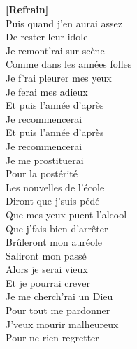 \documentclass{novel}
\begin{document}
\begin{multicols}{2}
\textbf{[Refrain]}\\

Puis quand j'en aurai assez\\
De rester leur idole\\
Je remont'rai sur scène\\
Comme dans les années folles\\
Je f'rai pleurer mes yeux\\
Je ferai mes adieux\\

Et puis l'année d'après\\
Je recommencerai\\
Et puis l'année d'après\\
Je recommencerai\\
Je me prostituerai\\
Pour la postérité\\

Les nouvelles de l'école\\
Diront que j'suis pédé\\
Que mes yeux puent l'alcool\\
Que j'fais bien d'arrêter\\
Brûleront mon auréole\\
Saliront mon passé\\

Alors je serai vieux\\
Et je pourrai crever\\
Je me cherch'rai un Dieu\\
Pour tout me pardonner\\
J'veux mourir malheureux\\
Pour ne rien regretter
\end{multicols}
\end{document}
